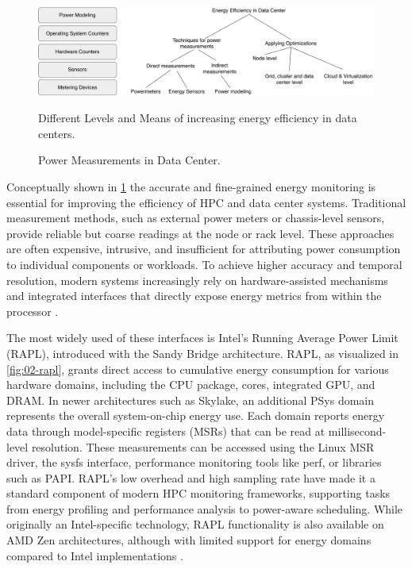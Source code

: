 \begin{figure}[H]
    \centering
    \includegraphics[scale=0.4]{fig/02/02-energy-overview.pdf}
    \small
    \caption{Power Measurements in Data Center.}
    \label{fig:02-energy-overview}
    \tiny
    Different Levels and Means of increasing energy efficiency in data centers.
\end{figure}

Conceptually shown in \ref{fig:02-energy-overview} the accurate and fine-grained energy monitoring is essential for improving the efficiency of HPC and data center systems. Traditional measurement methods, such as external power meters or chassis-level sensors, provide reliable but coarse readings at the node or rack level. These approaches are often expensive, intrusive, and insufficient for attributing power consumption to individual components or workloads. To achieve higher accuracy and temporal resolution, modern systems increasingly rely on hardware-assisted mechanisms and integrated interfaces that directly expose energy metrics from within the processor \cite{khan2018energy}.

The most widely used of these interfaces is Intel's Running Average Power Limit (RAPL), introduced with the Sandy Bridge architecture. RAPL, as visualized in \ref{fig:02-rapl}, grants direct access to cumulative energy consumption for various hardware domains, including the CPU package, cores, integrated GPU, and DRAM. In newer architectures such as Skylake, an additional PSys domain represents the overall system-on-chip energy use. Each domain reports energy data through model-specific registers (MSRs) that can be read at millisecond-level resolution. These measurements can be accessed using the Linux MSR driver, the sysfs interface, performance monitoring tools like perf, or libraries such as PAPI. RAPL's low overhead and high sampling rate have made it a standard component of modern HPC monitoring frameworks, supporting tasks from energy profiling and performance analysis to power-aware scheduling. While originally an Intel-specific technology, RAPL functionality is also available on AMD Zen architectures, although with limited support for energy domains compared to Intel implementations \cite{khan2018energy}.

